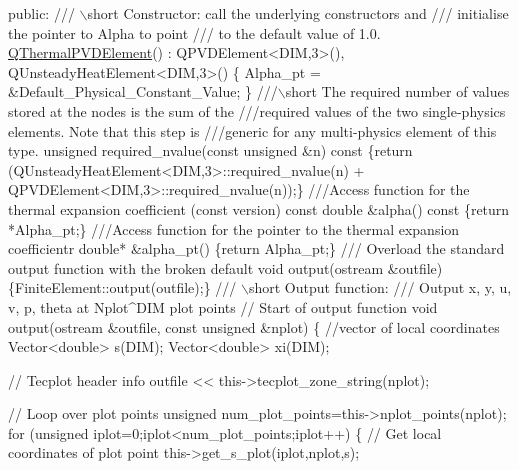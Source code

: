 \begin{DoxyCodeInclude}
\textcolor{keyword}{public}:\textcolor{comment}{}
\textcolor{comment}{ /// \(\backslash\)short Constructor: call the underlying constructors and }
\textcolor{comment}{ /// initialise the pointer to Alpha to point}
\textcolor{comment}{ /// to the default value of 1.0.}
\textcolor{comment}{} \hyperlink{classQThermalPVDElement}{QThermalPVDElement}() : QPVDElement<DIM,3>(),
                        QUnsteadyHeatElement<DIM,3>() 
  \{
   Alpha\_pt = &Default\_Physical\_Constant\_Value;
  \}
\textcolor{comment}{}
\textcolor{comment}{ ///\(\backslash\)short The required number of values stored at the nodes is the sum of the}
\textcolor{comment}{ ///required values of the two single-physics elements. Note that this step is}
\textcolor{comment}{ ///generic for any multi-physics element of this type.}
\textcolor{comment}{} \textcolor{keywordtype}{unsigned} required\_nvalue(\textcolor{keyword}{const} \textcolor{keywordtype}{unsigned} &n)\textcolor{keyword}{ const}
\textcolor{keyword}{  }\{\textcolor{keywordflow}{return} (QUnsteadyHeatElement<DIM,3>::required\_nvalue(n) +
           QPVDElement<DIM,3>::required\_nvalue(n));\}
\textcolor{comment}{}
\textcolor{comment}{ ///Access function for the thermal expansion coefficient (const version)}
\textcolor{comment}{} \textcolor{keyword}{const} \textcolor{keywordtype}{double} &alpha()\textcolor{keyword}{ const }\{\textcolor{keywordflow}{return} *Alpha\_pt;\}
\textcolor{comment}{}
\textcolor{comment}{ ///Access function for the pointer to the thermal expansion coefficientr}
\textcolor{comment}{} \textcolor{keywordtype}{double}* &alpha\_pt() \{\textcolor{keywordflow}{return} Alpha\_pt;\}
  \textcolor{comment}{}
\textcolor{comment}{ ///  Overload the standard output function with the broken default}
\textcolor{comment}{} \textcolor{keywordtype}{void} output(ostream &outfile) \{FiniteElement::output(outfile);\}
\textcolor{comment}{}
\textcolor{comment}{ /// \(\backslash\)short Output function:  }
\textcolor{comment}{ ///  Output x, y, u, v, p, theta at Nplot^DIM plot points}
\textcolor{comment}{} \textcolor{comment}{// Start of output function}
 \textcolor{keywordtype}{void} output(ostream &outfile, \textcolor{keyword}{const} \textcolor{keywordtype}{unsigned} &nplot)
  \{
   \textcolor{comment}{//vector of local coordinates}
   Vector<double> s(DIM);
   Vector<double> xi(DIM);
   
   \textcolor{comment}{// Tecplot header info}
   outfile << this->tecplot\_zone\_string(nplot);
   
   \textcolor{comment}{// Loop over plot points}
   \textcolor{keywordtype}{unsigned} num\_plot\_points=this->nplot\_points(nplot);
   \textcolor{keywordflow}{for} (\textcolor{keywordtype}{unsigned} iplot=0;iplot<num\_plot\_points;iplot++)
    \{
     \textcolor{comment}{// Get local coordinates of plot point}
     this->get\_s\_plot(iplot,nplot,s);
     

\end{DoxyCodeInclude}

